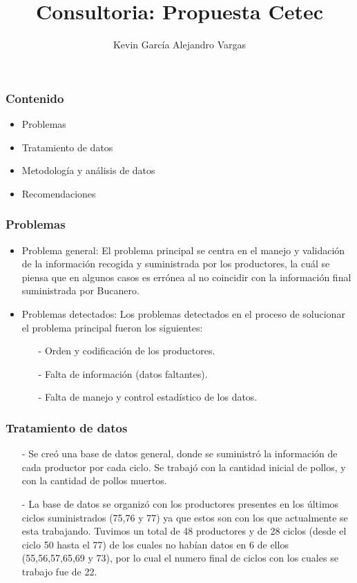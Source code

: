 \documentclass[11pt]{beamer}
\author[Kevin García - Alejandro Vargas]{Kevin García \newline Alejandro Vargas }
\title[Consultoria]{Consultoria: Propuesta Cetec}
\begin{document}
\justify
\begin{frame}
\titlepage
\end{frame}


\begin{frame}
\frametitle{Contenido}
\begin{itemize}
\item Problemas
\item Tratamiento de datos
\item Metodología y análisis de datos
\item Recomendaciones
\end{itemize}
\end{frame}

\begin{frame}
\frametitle{Problemas}
\begin{itemize}
\item Problema general: El problema principal se centra en el manejo y validación de la información recogida y suministrada por los productores, la cuál se piensa que en algunos casos es errónea al no coincidir con la información final suministrada por Bucanero.
\item Problemas detectados: Los problemas detectados en el proceso de solucionar el problema principal fueron los siguientes:
\begin{itemize}
\item[-]Orden y codificación de los productores.
\item[-]Falta de información (datos faltantes).
\item[-]Falta de manejo y control estadístico de los datos.
\end{itemize}
\end{itemize}
\end{frame}

\begin{frame}
\frametitle{Tratamiento de datos}
\begin{itemize}
\item[-]Se creó una base de datos general, donde se suministró la información de cada productor por cada ciclo. Se trabajó con la cantidad inicial de pollos, y con la cantidad de pollos muertos.
\item[-]La base de datos se organizó con los productores presentes en los últimos ciclos suministrados (75,76 y 77) ya que estos son con los que actualmente se esta trabajando. Tuvimos un total de 48 productores y de 28 ciclos (desde el ciclo 50 hasta el 77) de los cuales no habían datos en 6 de ellos (55,56,57,65,69 y 73), por lo cual el numero final de ciclos con los cuales se trabajo fue de 22.
\end{itemize}
\end{frame}
\end{document}
